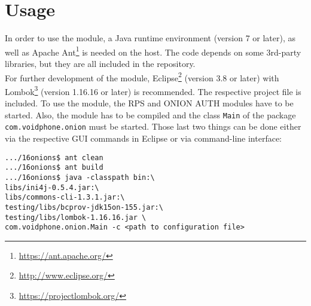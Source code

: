 \documentclass{article}
\begin{document}
\section{Usage}
In order to use the module, a Java runtime environment (version 7 or later), as well as Apache Ant\footnote{\url{https://ant.apache.org/}} is needed on the host. The code depends on some 3rd-party libraries, but they are all included in the repository. \\
For further development of the module, Eclipse\footnote{\url{http://www.eclipse.org/}} (version 3.8 or later) with Lombok\footnote{\url{https://projectlombok.org/}} (version 1.16.16 or later) is recommended. The respective project file is included.
To use the module, the RPS and ONION AUTH modules have to be started. Also, the module has to be compiled and the class \texttt{Main} of the package \texttt{com.voidphone.onion} must be started. Those last two things can be done either via the respective GUI commands in Eclipse or via command-line interface:
\begin{lstlisting}
.../16onions$ ant clean
.../16onions$ ant build
.../16onions$ java -classpath bin:\
libs/ini4j-0.5.4.jar:\
libs/commons-cli-1.3.1.jar:\
testing/libs/bcprov-jdk15on-155.jar:\
testing/libs/lombok-1.16.16.jar \
com.voidphone.onion.Main -c <path to configuration file>
\end{lstlisting}
\end{document}
